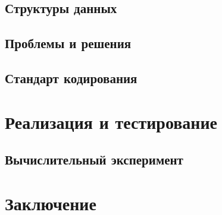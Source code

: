 \documentclass{fefu}
\begin{document}
  \subsection{Структуры данных}
  
  \subsection{Проблемы и решения}
  
  \subsection{Стандарт кодирования}
  

  \section{Реализация и тестирование}
  
  \subsection{Вычислительный эксперимент}
  

  \section*{Заключение}
  

  \newpage
  \nocite{*} %
  
  
\end{document}
